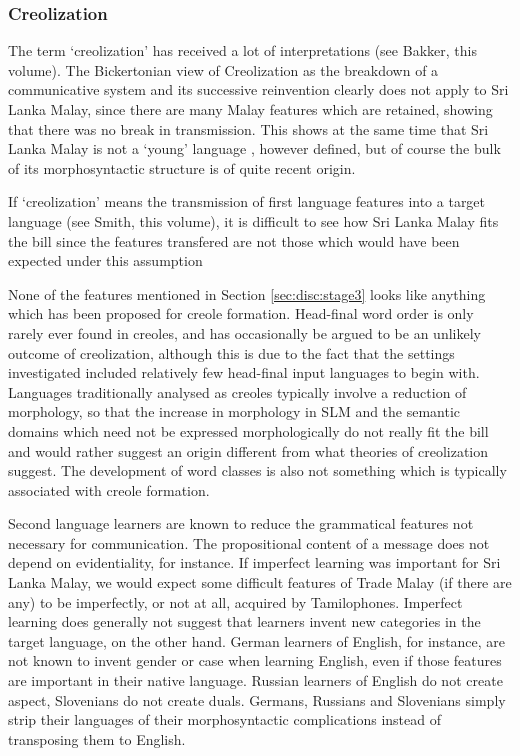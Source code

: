 \subsubsection{Creolization}
The term `creolization' has received a lot of interpretations (see Bakker, this volume). The Bickertonian view of Creolization as the breakdown of a communicative system and its successive reinvention clearly does not apply to Sri Lanka Malay, since there are many Malay features which are retained, showing that there was no break in transmission.
This shows at the same time that Sri Lanka Malay is not a `young' language \citep[cf][]{AnsaldoEtAl2009age}, however defined, but of course the bulk of its morphosyntactic structure is of quite recent origin.

% 

If `creolization' means the transmission of first language features into a target language (see Smith, this volume), it is difficult to see how Sri Lanka Malay fits the bill since the features transfered are not those which would have been expected under this assumption
 
None of the features mentioned in Section \ref{sec:disc:stage3} looks like anything which has been proposed for creole formation. Head-final word order is only rarely ever found in creoles, and has occasionally be argued to be an unlikely outcome of creolization, although this is due to the fact that the settings investigated included relatively few head-final input languages to begin with. Languages traditionally analysed as creoles typically involve a reduction of morphology, so that the increase in morphology in SLM and the semantic domains which need not be expressed morphologically do not really fit the bill and would rather suggest an origin different from what theories of creolization suggest. The development of word classes is also not something which is typically associated with creole formation. 

Second language learners are known to reduce the grammatical features not necessary for communication. The propositional content of a message does not depend on evidentiality, for instance. If imperfect learning was important for Sri Lanka Malay, we would expect some difficult features of Trade Malay (if there are any) to be imperfectly, or not at all,  acquired by Tamilophones. Imperfect learning does generally not suggest that learners invent new categories in the target language, on the other hand. German learners of English, for instance, are not known to invent gender or case when learning English, even if those features are important in their native language. Russian learners of English do not create aspect, Slovenians do not create duals. Germans, Russians and Slovenians simply strip their languages of their morphosyntactic complications instead of transposing them to English.

